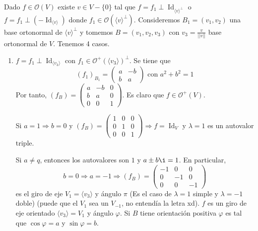 \documentclass[12pt, a4paper, ones, notitlepage, openany,titlepage]{article}
\begin{document}
Dado $f \in \mathcal{O}(V)$ existe $v \in V-\{0\}$ tal que $f 
= f_1 \perp \operatorname{Id}_{\langle v \rangle^\perp}$ o $f = f_1 \perp (-\operatorname{Id}_{\langle v \rangle})$ donde $f_1 \in \mathcal{O}(\langle v \rangle^\perp)$. Consideremos $B_1 = (v_1, v_2)$ una base ortonormal de $\langle v \rangle^\perp$ y tomemos $B = (v_1,v_2,v_3)$ con $\displaystyle v_3 = \frac{v}{||v||}$ base ortonormal de $V$. Tenemos 4 casos.
\begin{enumerate}[label=(\arabic*)]
	\item $f = f_1 \perp \operatorname{Id}_{\langle v_3 \rangle}$ con $f_1 \in \mathcal{O}^+(\langle v_3 \rangle)^\perp$. Se tiene que
	$$
	\left(f_1\right)_{B_1} = \begin{pmatrix}
		a & -b \\
		b & a
	\end{pmatrix} \text{ con } a^2 + b^2 = 1
	$$
	Por tanto, $\displaystyle \left(f_B\right) = \begin{pmatrix}
		a & -b & 0 \\
		b & a & 0 \\
		0 & 0 & 1
	\end{pmatrix}$. Es claro que $f \in \mathcal{O}^+(V)$.
	
	Si $a = 1 \Longrightarrow b = 0$ y $\displaystyle \left(f_B\right) = \begin{pmatrix}
		1 & 0 & 0 \\
		0 & 1 & 0 \\
		0 & 0 & 1
	\end{pmatrix} \Longrightarrow f = \operatorname{Id}_V$ y $\lambda = 1$ es un autovalor triple.
	
	Si $a \neq q$, entonces los autovalores son $1$ y $a \pm b \i = 1$. En particular,
	$$
	b = 0 \Longrightarrow a = -1 \Longrightarrow \left(f_B\right) = \begin{pmatrix}
		-1 & 0 & 0 \\
		0 & -1 & 0 \\
		0 & 0 & -1
	\end{pmatrix}
	$$
	es el giro de eje $V_1 = \langle v_3 \rangle$ y ángulo $\pi$ (Es el caso de $\lambda = 1$ simple y $\lambda = -1$ doble) (puede que el $V_1$ sea un $V_{-1}$, no entendía la letra xd). $f$ es un giro de eje orientado $\langle v_3 \rangle = V_1$ y ángulo $\varphi$. Si $B$ tiene orientación positiva $\varphi$ es tal que $\cos \varphi = a$ y $\sin \varphi = b$.
	

\end{enumerate}
\end{document}
